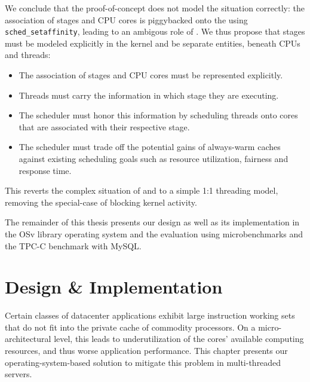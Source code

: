 \documentclass[12pt,a4paper]{book}
\begin{document}
We conclude that the proof-of-concept does not model the situation correctly: the association of stages and CPU cores is piggybacked onto the \klts using \texttt{sched\_setaffinity}, leading to an ambigous role of \klts.
We thus propose that stages must be modeled explicitly in the kernel and be separate entities, beneath CPUs and threads:
\begin{itemize}%
    \item The association of stages and CPU cores must be represented explicitly.
    \item Threads must carry the information in which stage they are executing.
    \item The scheduler must honor this information by scheduling threads onto cores that are associated with their respective stage.
    \item The scheduler must trade off the potential gains of always-warm caches against existing scheduling goals such as resource utilization, fairness and response time.
\end{itemize}%
This reverts the complex situation of \ults and \klts to a simple 1:1 threading model, removing the special-case of blocking kernel activity.

The remainder of this thesis presents our design as well as its implementation in the OSv library operating system and the evaluation using microbenchmarks and the TPC-C benchmark with MySQL.

\chapter{Design \& Implementation}\label{ch:di}
Certain classes of datacenter applications exhibit large instruction working sets that do not fit into the private cache of commodity processors.
On a micro-architectural level, this leads to underutilization of the cores' available computing resources, and thus worse application performance.
This chapter presents our operating-system-based solution to mitigate this problem in multi-threaded servers.
\end{document}
